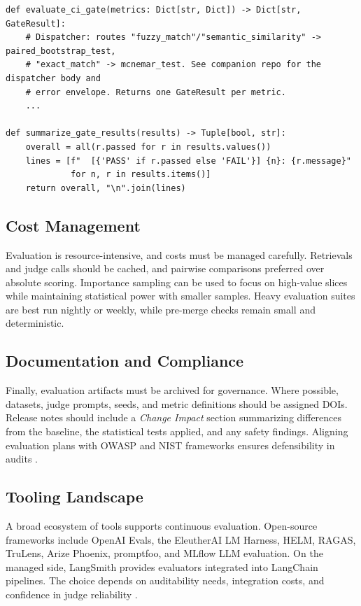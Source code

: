 \begin{codebox}
\begin{verbatim}
def evaluate_ci_gate(metrics: Dict[str, Dict]) -> Dict[str, GateResult]:
    # Dispatcher: routes "fuzzy_match"/"semantic_similarity" -> paired_bootstrap_test,
    # "exact_match" -> mcnemar_test. See companion repo for the dispatcher body and
    # error envelope. Returns one GateResult per metric.
    ...

def summarize_gate_results(results) -> Tuple[bool, str]:
    overall = all(r.passed for r in results.values())
    lines = [f"  [{'PASS' if r.passed else 'FAIL'}] {n}: {r.message}"
             for n, r in results.items()]
    return overall, "\n".join(lines)
\end{verbatim}
\end{codebox}

\subsection{Cost Management}
Evaluation is resource-intensive, and costs must be managed carefully. Retrievals and judge calls should be cached, and pairwise comparisons preferred over absolute scoring. Importance sampling can be used to focus on high-value slices while maintaining statistical power with smaller samples. Heavy evaluation suites are best run nightly or weekly, while pre-merge checks remain small and deterministic.

\subsection{Documentation and Compliance}
Finally, evaluation artifacts must be archived for governance. Where possible, datasets, judge prompts, seeds, and metric definitions should be assigned DOIs. Release notes should include a \emph{Change Impact} section summarizing differences from the baseline, the statistical tests applied, and any safety findings. Aligning evaluation plans with OWASP and NIST frameworks ensures defensibility in audits \cite{owasp_llm,nist_genai_profile}.

\subsection{Tooling Landscape}
A broad ecosystem of tools supports continuous evaluation. Open-source frameworks include OpenAI Evals, the EleutherAI LM Harness, HELM, RAGAS, TruLens, Arize Phoenix, promptfoo, and MLflow LLM evaluation. On the managed side, LangSmith provides evaluators integrated into LangChain pipelines. The choice depends on auditability needs, integration costs, and confidence in judge reliability \cite{openai_evals}.  

